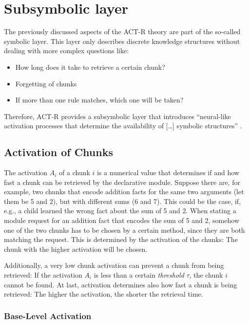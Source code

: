 \section{Subsymbolic layer}
\label{subsymbolic_layer}

The previously discussed aspects of the ACT-R theory are part of the so-called symbolic layer. This layer only describes discrete knowledge structures without dealing with more complex questions like: 

\begin{itemize}
\item How long does it take to retrieve a certain chunk? 
\item Forgetting of chunks
\item If more than one rule matches, which one will be taken?
\end{itemize}

Therefore, ACT-R provides a subsymbolic layer that introduces ``neural-like activation processes that determine the availability of [\dots] symbolic structures'' \cite{anderson_implications_2000}.

\subsection{Activation of Chunks}
\label{activation}

The activation $A_i$ of a chunk $i$ is a numerical value that determines if and how fast a chunk can be retrieved by the declarative module. Suppose there are, for example, two chunks that encode addition facts for the same two arguments (let them be 5 and 2), but with different sums (6 and 7). This could be the case, if, e.g., a child learned the wrong fact about the sum of 5 and 2. When stating a module request for an addition fact that encodes the sum of 5 and 2, somehow one of the two chunks has to be chosen by a certain method, since they are both matching the request. This is determined by the activation of the chunks: The chunk with the higher activation will be chosen.

Additionally, a very low chunk activation can prevent a chunk from being retrieved: If the activation $A_i$ is less than a certain \emph{threshold} $\tau$, the chunk $i$ cannot be found. At last, activation determines also how fast a chunk is being retrieved: The higher the activation, the shorter the retrieval time.

\subsubsection{Base-Level Activation}
\label{base_level_activation}

